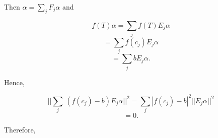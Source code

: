 Then \(\alpha=\sum\limits_{j}F_{j}\alpha\) and

\[f(T)\alpha = \sum\limits_{j}f(T)E_{j}\alpha\] \[= \sum\limits_{j}f(c_{j})E_{j}\alpha\] \[= \sum\limits_{j}bE_{j}\alpha.\]

Hence,

\[||\sum\limits_{j}\ (f(c_{j})-b)E_{j}\alpha||^{2} = \sum\limits_{j}|f(c_{j})-b|^{2}||E_{j}\alpha||^{2}\] \[= 0.\]

Therefore, \ 